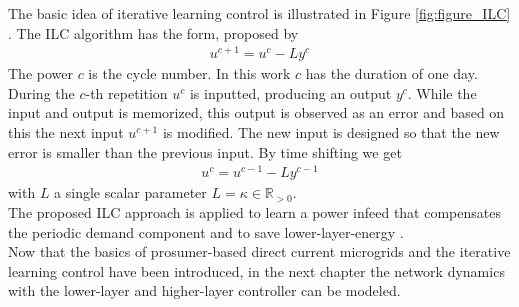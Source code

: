 The basic idea of iterative learning control is illustrated in Figure \ref{fig:figure_ILC} \cite[p.427]{moore_ilc}. The ILC algorithm has the form, proposed by \cite{paperilc}
\begin{align}
    u^{c+1}= u^{c}- Ly^{c}
\end{align}
The power $c$ is the cycle number. In this work $c$ has the duration of one day. During the $c$-th repetition $u^c$ is inputted, producing an output $y^c$. While the input and output is memorized, this output is observed as an error and based on this the next input $u^{c+1}$ is modified. The new input is designed so that the new error is smaller than the previous input. By time shifting we get
\begin{align}
    u^{c}= u^{c-1}- Ly^{c-1} \label{eq:ilc_inp_th}
\end{align}
with $L$ a single scalar parameter $ L = \kappa \in \mathbb{R}_{>0}$.\\
The proposed ILC approach is applied to learn a power infeed that compensates the periodic demand component and to save lower-layer-energy \cite{paperilc}. \\Now that the basics of prosumer-based direct current microgrids and the iterative learning control have been introduced, in the next chapter the network dynamics with the lower-layer and higher-layer controller can be modeled.
